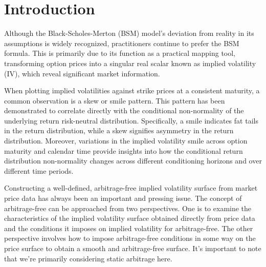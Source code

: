 
\section{Introduction}

Although the Black-Scholes-Merton (BSM) model's deviation from reality in its assumptions is widely recognized, 
practitioners continue to prefer the BSM formula. This is primarily due to its 
function as a practical mapping tool, transforming option prices into a singular 
real scalar known as implied volatility (IV), which reveal significant market 
information.

When plotting implied volatilities against strike prices at a consistent 
maturity, a common observation is a skew or smile pattern. 
This pattern has been demonstrated to correlate directly with the conditional 
non-normality of the underlying return risk-neutral distribution. 
Specifically, a smile indicates fat tails in the return distribution, 
while a skew signifies asymmetry in the return distribution. 
Moreover, variations in the implied volatility smile across option maturity 
and calendar time provide insights into how the conditional return distribution 
non-normality changes across different conditioning horizons and over different time periods.

Constructing a well-defined, arbitrage-free implied volatility surface from market price data has always been an important and pressing issue.
The concept of arbitrage-free can be approached from two perspectives. 
One is to examine the characteristics of the implied volatility surface obtained directly from price data and the conditions it imposes on implied volatility for arbitrage-free. 
The other perspective involves how to impose arbitrage-free conditions in some way on the price surface to obtain a smooth and arbitrage-free surface. 
It's important to note that we're primarily considering static arbitrage here.
